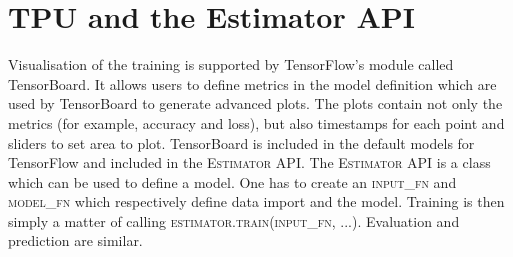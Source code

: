 \section{TPU and the Estimator API}
\label{sec:tpu_and_api}
Visualisation of the training is supported by TensorFlow's module called TensorBoard.
It allows users to define metrics in the model definition which are used by TensorBoard to generate advanced plots.
The plots contain not only the metrics (for example, accuracy and loss), but also timestamps for each point and sliders to set area to plot.
TensorBoard is included in the default models for TensorFlow and included in the \textsc{Estimator} API.
The \textsc{Estimator} API is a class which can be used to define a model.
One has to create an \textsc{input\_fn} and \textsc{model\_fn} which respectively define data import and the model.
Training is then simply a matter of calling \textsc{estimator.train(input\_fn, ...)}.
Evaluation and prediction are similar.

